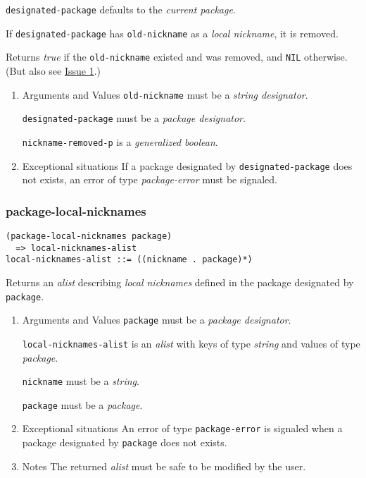 \documentclass[11pt]{article}
\begin{document}
\texttt{designated-package} defaults to the \emph{current package}.

If \texttt{designated-package} has \texttt{old-nickname} as a \emph{local nickname}, it is removed.

Returns \emph{true} if the \texttt{old-nickname} existed and was removed, and \texttt{NIL}
otherwise. (But also see \hyperref[sec:org6f1e9ed]{Issue 1}.)
\begin{enumerate}
\item Arguments and Values
\label{sec:orgb74602c}
\texttt{old-nickname} must be a \emph{string designator}.

\texttt{designated-package} must be a \emph{package designator}.

\texttt{nickname-removed-p} is a \emph{generalized boolean}.
\item Exceptional situations
\label{sec:orgaeb0739}
If a package designated by \texttt{designated-package} does not exists, an error of type
\emph{package-error} must be signaled.
\end{enumerate}
\subsubsection{package-local-nicknames}
\label{sec:org2747466}
\begin{verbatim}
(package-local-nicknames package)
  => local-nicknames-alist
local-nicknames-alist ::= ((nickname . package)*)
\end{verbatim}

Returns an \emph{alist} describing \emph{local nicknames} defined in the package designated
by \texttt{package}.
\begin{enumerate}
\item Arguments and Values
\label{sec:orgcb97b63}
\texttt{package} must be a \emph{package designator}.

\texttt{local-nicknames-alist} is an \emph{alist} with keys of type \emph{string} and values of
type \emph{package}.

\texttt{nickname} must be a \emph{string}.

\texttt{package} must be a \emph{package}.
\item Exceptional situations
\label{sec:org76f71ed}
An error of type \texttt{package-error} is signaled when a package designated by
\texttt{package} does not exists.
\item Notes
\label{sec:org31a80ba}
The returned \emph{alist} must be safe to be modified by the user.
\end{enumerate}
\end{document}
